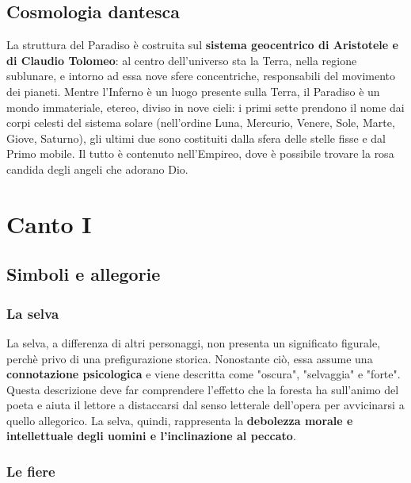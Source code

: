 \documentclass[10pt,a4paper]{article}
\begin{document}
 	\subsection{Cosmologia dantesca}
 	
 	La struttura del Paradiso è costruita sul \textbf{sistema geocentrico di Aristotele e di Claudio Tolomeo}: al centro dell'universo sta la Terra, nella regione sublunare, e intorno ad essa nove sfere concentriche, responsabili del movimento dei pianeti. Mentre l'Inferno è un luogo presente sulla Terra, il Paradiso è un mondo immateriale, etereo, diviso in nove cieli: i primi sette prendono il nome dai corpi celesti del sistema solare (nell'ordine Luna, Mercurio, Venere, Sole, Marte, Giove, Saturno), gli ultimi due sono costituiti dalla sfera delle stelle fisse e dal Primo mobile. Il tutto è contenuto nell'Empireo, dove è possibile trovare la rosa candida degli angeli che adorano Dio.
 	
 \section{Canto I}
 
 	\subsection{Simboli e allegorie}
 	
 		\subsubsection{La selva}
 		
 		La selva, a differenza di altri personaggi, non presenta un significato figurale, perchè privo di una prefigurazione storica. Nonostante ciò, essa assume una \textbf{connotazione psicologica} e viene descritta come "oscura", "selvaggia" e "forte". Questa descrizione deve far comprendere l'effetto che la foresta ha sull'animo del poeta e aiuta il lettore a distaccarsi dal senso letterale dell'opera per avvicinarsi a quello allegorico. La selva, quindi, rappresenta la \textbf{debolezza morale e intellettuale degli uomini e l'inclinazione al peccato}.
 		
 		\subsubsection{Le fiere}
 		
\end{document}
